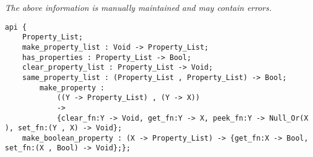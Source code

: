 \label{api:Property\_List}

{\tiny \it The above information is manually maintained and may contain errors.}
\begin{verbatim}
api {
    Property_List;
    make_property_list : Void -> Property_List;
    has_properties : Property_List -> Bool;
    clear_property_list : Property_List -> Void;
    same_property_list : (Property_List , Property_List) -> Bool;
        make_property :
            ((Y -> Property_List) , (Y -> X))
            ->
            {clear_fn:Y -> Void, get_fn:Y -> X, peek_fn:Y -> Null_Or(X ), set_fn:(Y , X) -> Void};
    make_boolean_property : (X -> Property_List) -> {get_fn:X -> Bool, set_fn:(X , Bool) -> Void};};
\end{verbatim}
